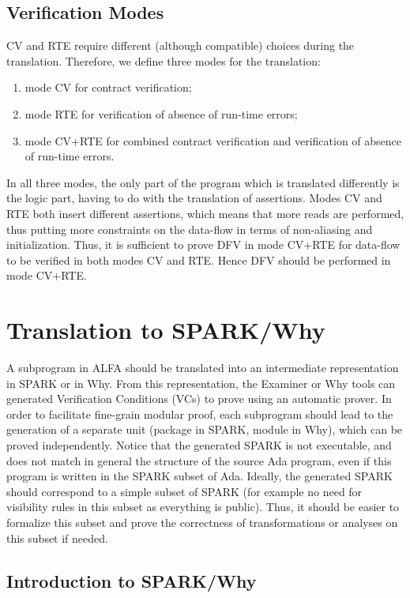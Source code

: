 \documentclass{article}
\newcounter{example}
\begin{document}
\subsection{Verification Modes}

CV and RTE require different (although compatible) choices during the
translation.  Therefore, we define three modes for the translation:
\begin{enumerate}
\item mode CV for contract verification;
\item mode RTE for verification of absence of run-time errors;
\item mode CV+RTE for combined contract verification and verification of
  absence of run-time errors.
\end{enumerate}

In all three modes, the only part of the program which is translated
differently is the logic part, having to do with the translation of
assertions. Modes CV and RTE both insert different assertions, which means that
more reads are performed, thus putting more constraints on the data-flow in
terms of non-aliasing and initialization. Thus, it is sufficient to prove DFV
in mode CV+RTE for data-flow to be verified in both modes CV and RTE. Hence DFV
should be performed in mode CV+RTE.

\section{Translation to SPARK/Why}

A subprogram in ALFA should be translated into an intermediate representation
in SPARK or in Why. From this representation, the Examiner or Why tools can
generated Verification Conditions (VCs) to prove using an automatic prover.  In
order to facilitate fine-grain modular proof, each subprogram should lead to
the generation of a separate unit (package in SPARK, module in Why), which can
be proved independently. Notice that the generated SPARK is not executable, and
does not match in general the structure of the source Ada program, even if this
program is written in the SPARK subset of Ada. Ideally, the generated SPARK
should correspond to a simple subset of SPARK (for example no need for
visibility rules in this subset as everything is public). Thus, it should be
easier to formalize this subset and prove the correctness of transformations or
analyses on this subset if needed.

\subsection{Introduction to SPARK/Why}
\end{document}
